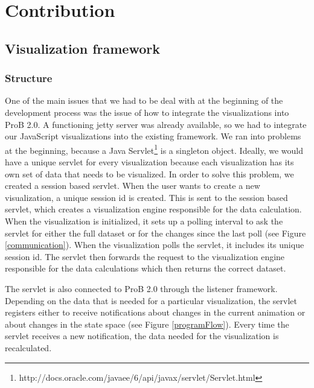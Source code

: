 \section{Contribution}

\subsection{Visualization framework}

\subsubsection{Structure}

One of the main issues that we had to be deal with at the beginning of the development process was the issue of how to integrate the visualizations into ProB 2.0. A functioning jetty server was already available, so we had to integrate our JavaScript visualizations into the existing framework. We ran into problems at the beginning, because a Java Servlet\footnote{http://docs.oracle.com/javaee/6/api/javax/servlet/Servlet.html} is a singleton object. Ideally, we would have a unique servlet for every visualization because each visualization has its own set of data that needs to be visualized. In order to solve this problem, we created a session based servlet. When the user wants to create a new visualization, a unique session id is created. This is sent to the session based servlet, which creates a visualization engine responsible for the data calculation. When the visualization is initialized, it sets up a polling interval to ask the servlet for either the full dataset or for the changes since the last poll (see Figure \ref{communication}). When the visualization polls the servlet, it includes its unique session id. The servlet then forwards the request to the visualization engine responsible for the data calculations which then returns the correct dataset.

The servlet is also connected to ProB 2.0 through the listener framework. Depending on the data that is needed for a particular visualization, the servlet registers either to receive notifications about changes in the current animation or about changes in the state space (see Figure \ref{programFlow}). Every time the servlet receives a new notification, the data needed for the visualization is recalculated.

